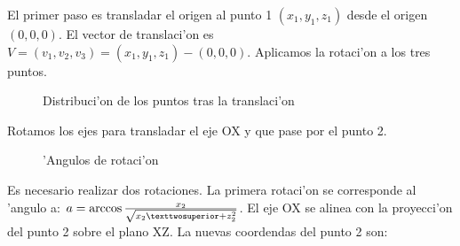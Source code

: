 El primer paso es transladar el origen al punto 1 $(x_1,y_1,z_1)$ desde el origen $(0,0,0)$. El vector de translaci'on es $V = (v_1,v_2,v_3) = (x_1,y_1,z_1) - (0, 0, 0)$. Aplicamos la rotaci'on a los tres puntos. 

\begin{figure}[h!]
	\begin{center}
     	\end{center}
    	\caption{Distribuci'on de los puntos tras la translaci'on}\label{fig:triang2}
\end{figure}

Rotamos los ejes para transladar el eje OX y que pase por el punto 2.

\begin{figure}[h!]
	\begin{center}
     	\end{center}
    	\caption{'Angulos de rotaci'on}\label{fig:triang3}
\end{figure}

Es necesario realizar dos rotaciones. La primera rotaci'on se corresponde al 'angulo a: $a = \arccos {x_2 \over {\sqrt{x_2²+z_2^2}}}$. El eje OX se alinea con la proyecci'on del punto 2 sobre el plano XZ. La nuevas coordendas del punto 2 son:

